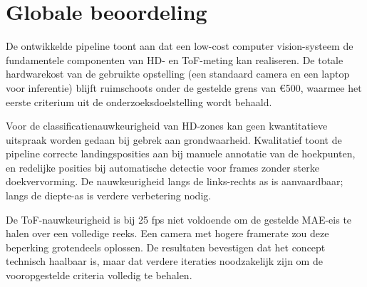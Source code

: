 
\section{Globale beoordeling}
\label{sec:evaluatie-globaal}

De ontwikkelde pipeline toont aan dat een low-cost computer vision-systeem de fundamentele componenten van HD- en ToF-meting kan realiseren. De totale hardwarekost van de gebruikte opstelling (een standaard camera en een laptop voor inferentie) blijft ruimschoots onder de gestelde grens van \euro{}500, waarmee het eerste criterium uit de onderzoeksdoelstelling wordt behaald.

Voor de classificatienauwkeurigheid van HD-zones kan geen kwantitatieve uitspraak worden gedaan bij gebrek aan grondwaarheid. Kwalitatief toont de pipeline correcte landingsposities aan bij manuele annotatie van de hoekpunten, en redelijke posities bij automatische detectie voor frames zonder sterke doekvervorming. De nauwkeurigheid langs de links-rechts as is aanvaardbaar; langs de diepte-as is verdere verbetering nodig.

De ToF-nauwkeurigheid is bij 25 fps niet voldoende om de gestelde MAE-eis te halen over een volledige reeks. Een camera met hogere framerate zou deze beperking grotendeels oplossen. De resultaten bevestigen dat het concept technisch haalbaar is, maar dat verdere iteraties noodzakelijk zijn om de vooropgestelde criteria volledig te behalen.
